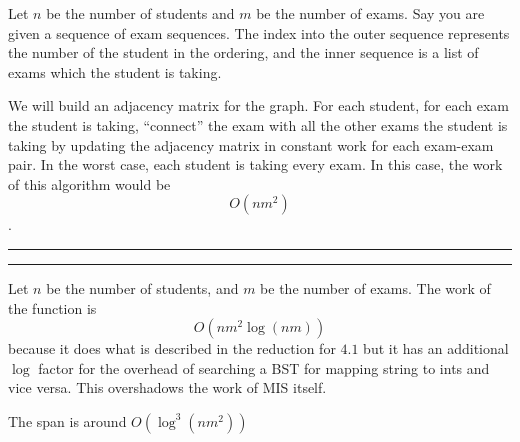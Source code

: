 \documentclass[11pt,letterpaper]{article}
\newcommand{\question}[2] {\vspace{.25in} \hrule\vspace{0.5em}
\noindent{\bf #1: #2} \vspace{0.5em}
\hrule \vspace{.10in}}
\begin{document}
Let $n$ be the number of students and
    $m$ be the number of exams.
Say you are given a sequence of exam sequences. The index into the
outer sequence represents the number of the student in the ordering,
and the inner sequence is a list of exams which the student is taking.

We will build an adjacency matrix for the graph. For each student,
for each exam the student is taking, ``connect'' the exam with all
the other exams the student is taking by updating the adjacency matrix
in constant work for each exam-exam pair. In the worst case,
each student is taking every exam. In this case, the work of this algorithm would be
$$O(nm^{2})$$.



\question{5}{Task 4.5}
Let $n$ be the number of students, and $m$ be the number of exams.
The work of the function is $$O(nm^2\log(nm))$$ because it does what is described in
the reduction for $4.1$ but it has an additional $\log$ factor for the overhead
of searching a BST for mapping string to ints and vice versa. This overshadows
the work of MIS itself.

The span is around $O(\log^3(nm^2))$
\end{document}
